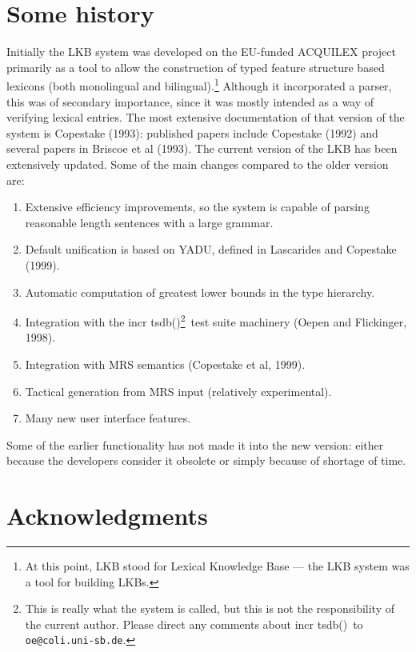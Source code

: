 \documentclass[12pt]{report}
\newcommand{\itsdb}{{\sf \lbrack incr tsdb()\rbrack}}
\begin{document}
\section{Some history}

Initially the LKB system was developed on the 
EU-funded ACQUILEX project primarily as a
tool to allow the construction of typed feature structure based lexicons
(both monolingual and bilingual).\footnote{At this point, LKB stood for
Lexical Knowledge Base --- the LKB system was a tool for building
LKBs.} 
Although it incorporated a parser,
this was of secondary importance, since it was mostly intended as
a way of verifying lexical entries.  The most extensive documentation
of that version of the system is Copestake (1993): published
papers include Copestake (1992) and several papers in Briscoe et al (1993).
The current version of the LKB has 
been extensively updated.  Some of the main changes compared to the older
version are:
\begin{enumerate}
\item Extensive efficiency improvements, so the system is capable
of parsing reasonable length sentences with a large grammar.
\item Default unification is based on YADU, defined in Lascarides and
Copestake (1999).
\item Automatic computation of greatest lower bounds in the type hierarchy.
\item Integration with the \itsdb\footnote{This is really
what the system is called, but this is not
the responsibility of the current author.  Please direct any comments
about \itsdb\ to {\tt oe@coli.uni-sb.de}.}\ test suite machinery 
(Oepen and Flickinger, 1998).
\item Integration with MRS semantics (Copestake et al, 1999).
\item Tactical generation from MRS input (relatively experimental). 
\item Many new user interface features.
\end{enumerate}
Some of the earlier functionality has not made it into the new version:
either because the developers consider it obsolete or simply because of
shortage of time.  

\section{Acknowledgments}
\label{ack}
\end{document}
